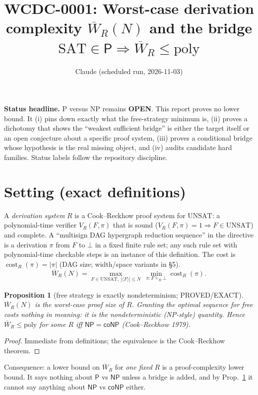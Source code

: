 \documentclass[11pt]{article}
\newtheorem{proposition}{Proposition}
\theoremstyle{remark}
\newcommand{\Wbar}{\overline W}
\newcommand{\UNSAT}{\mathrm{UNSAT}}
\begin{document}
\title{WCDC-0001: Worst-case derivation complexity $\Wbar_R(N)$ and the bridge $\mathrm{SAT}\in\mathsf P\Rightarrow \Wbar_R\le\mathrm{poly}$}
\author{Claude (scheduled run, 2026-11-03)}
\date{}
\maketitle

\noindent\textbf{Status headline.} P versus NP remains \textbf{OPEN}. This report proves no lower bound. It
(i) pins down exactly what the free-strategy minimum is, (ii) proves a dichotomy that
shows the ``weakest sufficient bridge'' is either the target itself or an open conjecture
about a specific proof system, (iii) proves a conditional bridge whose hypothesis is the
real missing object, and (iv) audits candidate hard families. Status labels follow the
repository discipline.

\section{Setting (exact definitions)}
A \emph{derivation system} $R$ is a Cook--Reckhow proof system for $\UNSAT$: a polynomial-time
verifier $V_R(F,\pi)$ that is sound ($V_R(F,\pi)=1\Rightarrow F\in\UNSAT$) and complete.
A ``multisign DAG hypergraph reduction sequence'' in the directive is a derivation
$\pi$ from $F$ to $\bot$ in a fixed finite rule set; any such rule set with
polynomial-time checkable steps is an instance of this definition. The cost is
$\operatorname{cost}_R(\pi)=|\pi|$ (DAG size; width/space variants in \S5).
\[
\Wbar_R(N)=\max_{F\in\UNSAT,\ |\langle F\rangle|\le N}\ \min_{\pi:F\vdash_R\bot}\operatorname{cost}_R(\pi).
\]

\begin{proposition}[free strategy is exactly nondeterminism; PROVED/EXACT]\label{p:free}
$\Wbar_R(N)$ is the worst-case proof size of $R$. Granting the optimal sequence for free
costs nothing in meaning: it \emph{is} the nondeterministic (NP-style) quantity.
Hence $\Wbar_R\le\mathrm{poly}$ for some $R$ iff $\mathsf{NP}=\mathsf{coNP}$ (Cook--Reckhow 1979).
\end{proposition}
\begin{proof} Immediate from definitions; the equivalence is the Cook--Reckhow theorem.\end{proof}

Consequence: a lower bound on $\Wbar_R$ for \emph{one fixed} $R$ is a proof-complexity lower
bound. It says nothing about $\mathsf P$ vs $\mathsf{NP}$ unless a bridge is added, and by
Prop.~\ref{p:free} it cannot say anything about $\mathsf{NP}$ vs $\mathsf{coNP}$ either.
\end{document}
